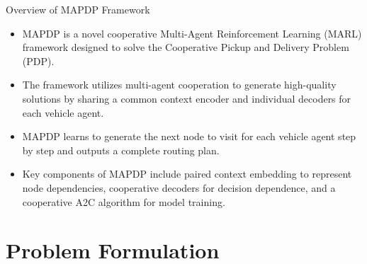 \documentclass{beamer}
\begin{document}
\begin{frame}{Overview of MAPDP Framework}
	\begin{itemize}
		\item MAPDP is a novel cooperative Multi-Agent Reinforcement Learning (MARL) framework designed to solve the Cooperative Pickup and Delivery Problem (PDP).
		\item The framework utilizes multi-agent cooperation to generate high-quality solutions by sharing a common context encoder and individual decoders for each vehicle agent.
		\item MAPDP learns to generate the next node to visit for each vehicle agent step by step and outputs a complete routing plan.
		\item Key components of MAPDP include paired context embedding to represent node dependencies, cooperative decoders for decision dependence, and a cooperative A2C algorithm for model training.
	\end{itemize}
\end{frame}

\section{Problem Formulation}

\end{document}

